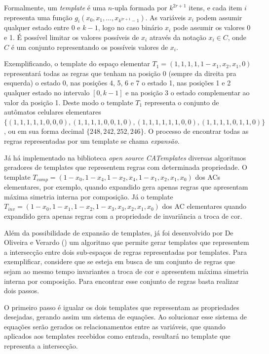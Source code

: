 \documentclass[12pt, a4paper]{article}
\begin{document}
Formalmente, um \textit{template} é uma $n$-upla formada por $k^{2r+1}$ itens, e cada item $i$ representa uma função $g_i(x_0,x_1,\dots,x_{k^{2r+1}-1})$. As variáveis $x_i$ podem assumir qualquer estado entre 0 e $k-1$, logo no caso binário $x_i$ pode assumir os valores 0 e 1. É possível limitar os valores possíveis de $x_i$ através da notação $x_i \in C$, onde $C$ é um conjunto representando os possíveis valores de $x_i$.

Exemplificando, o template do espaço elementar $T_1 = (1,1,1,1,1-x_1,x_2,x_1,0)$ representará todas as regras que tenham na posição 0 (sempre da direita pra esquerda) o estado 0, nas posições 4, 5, 6 e 7 o estado 1, nas posições 1 e 2 qualquer estado no intervalo $[0,k-1]$ e na posição 3 o estado complementar ao valor da posição 1. Deste modo o template $T_1$ representa o conjunto de autômatos celulares elementares $\{(1,1,1,1,1,0,0,0),(1,1,1,1,0,0,1,0),(1,1,1,1,1,1,0,0),(1,1,1,1,0,1,1,0)\}$, ou em sua forma decimal $\{248,242,252,246\}$. O processo de encontrar todas as regras representadas por um template se chama \textit{expansão}.

Já há implementado na biblioteca \textit{open source CATemplates} \cite{CATemplates} diversas algoritmos geradores de templates que representem regras com determinada propriedade. O template $T_{comp} = (1 - x_0, 1 - x_4, 1 - x_2, x_4, 1 - x_1, x_2, x_1, x_0)$ dos ACs elementares, por exemplo, quando expandido gera apenas regras que apresentam máxima simetria interna por composição. Já o template $T_{inv} = (1 - x_0, 1 - x_1, 1 - x_2, 1 - x_3, x_3, x_2, x_1, x_0)$ dos AC elementares quando expandido gera apenas regras com a propriedade de invariância a troca de cor.

Além da possibilidade de expansão de templates, já foi desenvolvido por De Oliveira e Verardo (\citeyear{deOliveira2014b}) um algoritmo que permite gerar templates que representem a intersecção entre dois sub-espaços de regras representadas por templates. Para exemplificar, considere que se esteja em busca de um conjunto de regras que sejam ao mesmo tempo invariantes a troca de cor e apresentem máxima simetria interna por composição. Para encontrar esse conjunto de regras basta realizar dois passos.

O primeiro passo é igualar os dois templates que representam as propriedades desejadas, gerando assim um sistema de equações. Ao solucionar esse sistema de equações serão gerados os relacionamentos entre as variáveis, que quando aplicados aos templates recebidos como entrada, resultará no template que representa a intersecção.
\end{document}
